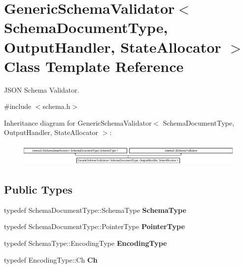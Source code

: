 \hypertarget{a02244}{}\section{Generic\+Schema\+Validator$<$ Schema\+Document\+Type, Output\+Handler, State\+Allocator $>$ Class Template Reference}
\label{a02244}


J\+S\+ON Schema Validator.  




{\ttfamily \#include $<$schema.\+h$>$}

Inheritance diagram for Generic\+Schema\+Validator$<$ Schema\+Document\+Type, Output\+Handler, State\+Allocator $>$\+:\begin{figure}[H]
\begin{center}
\leavevmode
\includegraphics[height=1.135903cm]{a02244}
\end{center}
\end{figure}
\subsection*{Public Types}
\begin{DoxyCompactItemize}
\item 
\mbox{\label{a02244_ac79628f00f6720bbabb70b44f0d076a0}} 
typedef Schema\+Document\+Type\+::\+Schema\+Type {\bfseries Schema\+Type}
\item 
\mbox{\label{a02244_ae0c6c9a9c0ff6bae80e75c6705f2668b}} 
typedef Schema\+Document\+Type\+::\+Pointer\+Type {\bfseries Pointer\+Type}
\item 
\mbox{\label{a02244_acf1c5361bb96da87d23167d8720b1ea5}} 
typedef Schema\+Type\+::\+Encoding\+Type {\bfseries Encoding\+Type}
\item 
\mbox{\label{a02244_a8b7dab5a0cda9cc0adaefb4401d260c1}} 
typedef Encoding\+Type\+::\+Ch {\bfseries Ch}
\end{DoxyCompactItemize}
